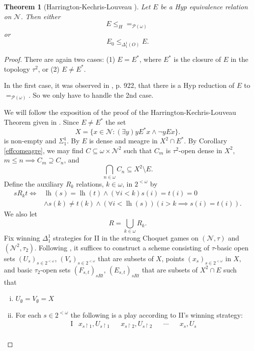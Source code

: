 \documentclass[11pt, english]{article}
\newtheorem{thm}{Theorem}
\DeclareMathOperator{\lh}{lh} \DeclareMathOperator{\inn}{Inn}
\newcommand{\restrict}{\upharpoonright}
\newcommand{\baire}{\mathscr N}
\begin{document}
\begin{thm}[Harrington-Kechris-Louveau  \cite{hakelou90}]
Let $E$ be a Hyp equivalence relation on $\baire$. Then
either
$$
E\leq_{H} =_{\mathcal{P}(\omega)}
$$
or
$$
E_0\leq_{\Delta^1_1(O)} E.
$$\label{hkl}
\end{thm}
\begin{proof}
There are again two cases: (1) $E=E^*$, where $E^*$ is the closure
of $E$ in the topology $\tau^2$, or (2) $E\neq E^*$.

In the first case, it was observed in \cite{hakelou90}, p. 922,
that there is a Hyp reduction of $E$ to $=_{\mathcal{P}(\omega)}$.
So we only have to handle the 2nd case.

We will follow the exposition of the proof of the
Harrington-Kechris-Louveau Theorem given in \cite[\S 6.3]{gao09}.
Since $E\neq E^*$ the set
$$
X=\{x\in \baire: (\exists y) yE^* x\wedge \neg yEx\}.
$$
is non-empty and $\Sigma^1_1$. By \cite[Lemma 6.3.8]{gao09} $E$ is
dense and meagre in $X^2\cap E^*$. By Corollary \ref{effcomeagre},
we may find $C\subseteq\omega\times\baire^2$ such that $C_m$ is
$\tau^2$-open dense in $X^2$, $m\leq n\implies C_m\supseteq C_n$,
and
$$
\bigcap_{n\in\omega} C_n\subseteq X^2\setminus E.
$$
Define the auxiliary $R_k$ relations, $k\in\omega$, in
$2^{<\omega}$ by
\begin{align*}
s R_k t\iff & \lh(s)=\lh(t)\wedge (\forall i<k) s(i)=t(i)=0\\
&\wedge s(k)\neq t(k)\wedge (\forall i<\lh(s))(i>k\implies
s(i)=t(i)).
\end{align*}
We also let
$$
R=\bigcup_{k\in\omega} R_k.
$$
Fix winning $\Delta^1_1$ strategies for II in the strong Choquet
games on $(\baire,\tau)$ and $(\baire^2,\tau_2)$. Following
\cite[Lemma 6.3.10]{gao09}, it suffices to construct a scheme
consisting of $\tau$-basic open sets $(U_s)_{s\in 2^{<\omega}}$,
$(V_s)_{s\in 2^{<\omega}}$ that are subsets of $X$, points
$(x_s)_{s\in 2^{<\omega}}$ in $X$, and basic $\tau_2$-open sets
$(F_{s,t})_{sRt}$, $(E_{s,t})_{sRt}$ that are subsets of $X^2\cap
E$ such that
\begin{enumerate}[(i)]
\item $U_\emptyset=V_\emptyset=X$ \item For each $s\in
2^{<\omega}$ the following is a play according to II's winning
strategy:
$$
\begin{array}{rlllllllll}
\mathrm{I}  & x_{s\restrict 1}, U_{s\restrict 1} &                  & x_{s\restrict 2}, U_{s\restrict 2}  &                  & \cdots  &        & x_s,U_s\\

\end{array}$$
\end{enumerate}
\end{proof}
\end{document}
